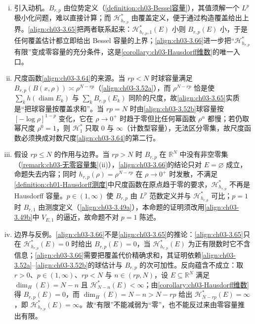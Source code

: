 \documentclass[../../main.tex]{subfiles}%
\begin{document}
\begin{remark}\label{remark:ch03-Hausdorff上界动机}
\begin{enumerate}[(i)]
\item 引入动机。$B_{r,p}$ 由位势定义（\cref{definition:ch03-Bessel容量}），其值须解一个 $L^p$ 极小化问题，难以直接计算；而 $\mathcal{H}^*_{h_{r,p}}$ 由覆盖定义，便于通过构造覆盖给出上界。\eqref{align:ch03-3.65}把两者联系起来：$\mathcal{H}^*_{h_{r,p},1}(E)$ 小则 $B_{r,p}(E)$ 小，于是任何覆盖估计都立即给出 Bessel 容量的上界；\eqref{align:ch03-3.66}进一步把“$\mathcal{H}^*_{h_{r,p}}$ 有限”变成零容量的充分条件，这是\cref{corollary:ch03-Hausdorff维数}的唯一入口。
\item 尺度函数\eqref{align:ch03-3.64}的来源。当 $rp<N$ 时球容量满足 $B_{r,p}(B(x,\rho))\asymp\rho^{N-rp}$（\eqref{align:ch03-3.52a}），而 $\rho^{N-rp}$ 恰是使 $\sum_k h(\operatorname{diam}E_k)$ 与 $\sum_k B_{r,p}(E_k)$ 同阶的尺度，故\eqref{align:ch03-3.65}实质是“把球容量按覆盖求和”。当 $rp=N$ 时由\eqref{align:ch03-3.52b}球容量按 $[-\log\rho]^{1-p}$ 变化，它在 $\rho\to0^+$ 时趋于零但比任何幂函数 $\rho^{\alpha}$ 都慢；若仍取幂尺度 $\rho^{0}=1$，则 $\mathcal{H}^*_{1}$ 只取 $0$ 与 $\infty$（计数型容量），无法区分零集，故尺度函数必须换成对数尺度\eqref{align:ch03-3.64}的第二行。
\item 假设 $rp\leqslant N$ 的作用与边界。当 $rp>N$ 时 $B_{r,p}$ 在 $\mathbb{R}^N$ 中没有非空零集（\cref{remark:ch03-无零容量集}(ii)），\eqref{align:ch03-3.66}的结论只对 $E=\varnothing$ 成立，命题失去内容；同时 $h_{r,p}(\rho)=\rho^{N-rp}$ 在 $\rho\to0^+$ 时发散，不满足\cref{definition:ch01-Hausdorff测度}中尺度函数在原点趋于零的要求，$\mathcal{H}^*_{h_{r,p}}$ 不再是 Hausdorff 容量。$p\in(1,\infty)$ 使 $B_{r,p}$ 由 $L^p$ 范数定义并与 $\mathcal{H}^*_{h_{r,p}}$ 可比；$p=1$ 时 $B_{r,1}$ 由测度定义（\eqref{align:ch03-3.49a}），本命题的证明须改用\eqref{align:ch03-3.49b}中 $V_{E,1}$ 的逼近，故命题不对 $p=1$ 陈述。
\item 边界与反例。\eqref{align:ch03-3.66}不是\eqref{align:ch03-3.65}的推论：\eqref{align:ch03-3.65}只在 $\mathcal{H}^*_{h_{r,p}}(E)=0$ 时给出 $B_{r,p}(E)=0$，当 $\mathcal{H}^*_{h_{r,p}}(E)$ 为正有限数时它不含信息；\eqref{align:ch03-3.66}需要把覆盖代价精确求和，其证明依赖\eqref{align:ch03-3.52a}--\eqref{align:ch03-3.52b}的球估计与 $B_{r,p}$ 的次可加性。反向蕴含不成立：取 $r>0$、$p\in(1,\infty)$、$rp<N$ 与 $n\in(rp,N)$，设 $E\subseteq\mathbb{R}^N$ 满足 $\dim_H(E)=N-n$ 且 $\mathcal{H}^*_{N-n}(E)<\infty$；由\cref{corollary:ch03-Hausdorff维数}得 $B_{r,p}(E)=0$，而 $\dim_H(E)=N-n>N-rp$ 给出 $\mathcal{H}^*_{N-rp}(E)=\infty$，即 $\mathcal{H}^*_{h_{r,p}}(E)=\infty$。故“有限”不能减弱为“零”，也不能反过来由零容量推出有限。
\end{enumerate}
\end{remark}
\end{document}
